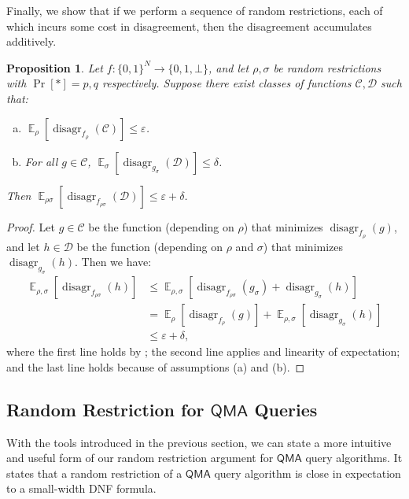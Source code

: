 \documentclass[11pt]{article}%
\newtheorem{proposition}[theorem]{Proposition}
\newcommand{\eps}{\varepsilon}
\newcommand{\E}{\mathop{\mathbb{E}}}
\DeclareMathOperator{\disagr}{\mathrm{disagr}}
\begin{document}
Finally, we show that if we perform a sequence of random restrictions, each of which incurs some cost in disagreement, then the disagreement accumulates additively.
\begin{proposition}
\label{prop:disagr_composing_restrictions}
Let $f: \{0,1\}^N \to \{0,1,\bot\}$, and let $\rho, \sigma$ be random restrictions with $\Pr[*] = p,q$ respectively. Suppose there exist classes of functions $\mathcal{C},\mathcal{D}$ such that:
\begin{enumerate}[(a)]
\item $\E_{\rho} \left[\disagr_{f_{\rho}}\left(\mathcal{C}\right)\right] \le \eps$.
\item For all $g \in \mathcal{C}$, $\E_\sigma \left[\disagr_{g_{\sigma}}\left(\mathcal{D}\right)\right] \le \delta$.
\end{enumerate}
Then $\E_{\rho \sigma} \left[\disagr_{f_{\rho \sigma}}\left(\mathcal{D}\right)\right] \le \eps + \delta$.
\end{proposition}
\begin{proof}
Let $g \in \mathcal{C}$ be the function (depending on $\rho$) that minimizes $\disagr_{f_\rho}(g)$, and let $h \in \mathcal{D}$ be the function (depending on $\rho$ and $\sigma$) that minimizes $\disagr_{g_\sigma}(h)$. Then we have:
\begin{align*}
\E_{\rho,\sigma}\left[\disagr_{f_{\rho \sigma}}(h)\right] &\le \E_{\rho,\sigma}\left[\disagr_{f_{\rho \sigma}}\left(g_\sigma\right) + \disagr_{g_{\sigma}}(h)\right]\\
&= \E_{\rho}\left[\disagr_{f_\rho}(g)\right] + \E_{\rho,\sigma}\left[\disagr_{g_\sigma}(h)\right]\\
&\le \eps + \delta,
\end{align*}
where the first line holds by ; the second line applies  and linearity of expectation; and the last line holds because of assumptions (a) and (b).
\end{proof}

\subsection{Random Restriction for \texorpdfstring{$\mathsf{QMA}$}{QMA} Queries}
With the tools introduced in the previous section, we can state a more intuitive and useful form of our random restriction argument for $\mathsf{QMA}$ query algorithms. It states that a random restriction of a $\mathsf{QMA}$ query algorithm is close in expectation to a small-width DNF formula.
\end{document}
